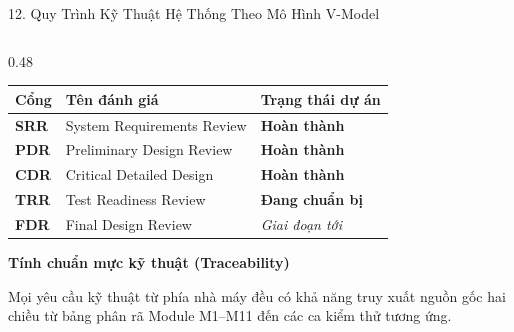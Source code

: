 \documentclass[aspectratio=169,9pt]{beamer}
\newcommand{\smallnote}[1]{{\fontsize{7.1}{8.4}\selectfont #1\par}}
\newcommand{\heading}[1]{{\bfseries\color{PTITRed} #1\par}}
\begin{document}
\begin{frame}{12. Quy Trình Kỹ Thuật Hệ Thống Theo Mô Hình V-Model}
\begin{columns}[T,onlytextwidth]
    \begin{column}{0.48\textwidth}
      \begin{tcolorbox}[titlepanel,title=5 Cổng đánh giá thiết kế (Design Reviews)]
        {\fontsize{7.2}{8.5}\selectfont
        \begin{tabularx}{\linewidth}{@{}llX@{}}
          \toprule
          \textbf{Cổng} & \textbf{Tên đánh giá} & \textbf{Trạng thái dự án} \\
          \midrule
          \textbf{SRR} & System Requirements Review & \textcolor{AccentGreen}{\textbf{Hoàn thành}} \\
          \textbf{PDR} & Preliminary Design Review & \textcolor{AccentGreen}{\textbf{Hoàn thành}} \\
          \textbf{CDR} & Critical Detailed Design & \textcolor{AccentGreen}{\textbf{Hoàn thành}} \\
          \textbf{TRR} & Test Readiness Review & \textcolor{PTITRed}{\textbf{Đang chuẩn bị}} \\
          \textbf{FDR} & Final Design Review & \textit{Giai đoạn tới} \\
          \bottomrule
        \end{tabularx}}
      \end{tcolorbox}
      \vspace{0.10cm}
      \begin{tcolorbox}[keypanel]
        \heading{Tính chuẩn mực kỹ thuật (Traceability)}
        \smallnote{Mọi yêu cầu kỹ thuật từ phía nhà máy đều có khả năng truy xuất nguồn gốc hai chiều từ bảng phân rã Module M1--M11 đến các ca kiểm thử tương ứng.}
      \end{tcolorbox}
    \end{column}
  \end{columns}
\end{frame}
\end{document}
